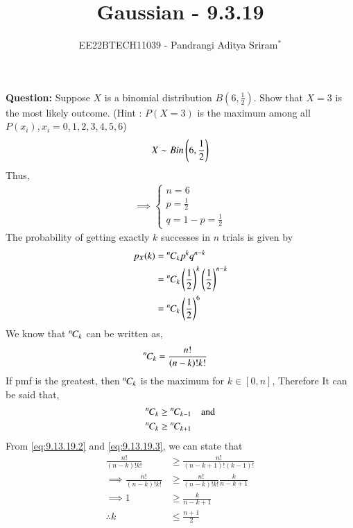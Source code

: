 \documentclass[journal,12pt,twocolumn]{IEEEtran}
\theoremstyle{remark}
\begin{document}

\vspace{3cm}

\title{Gaussian - 9.3.19}
\author{EE22BTECH11039 - Pandrangi Aditya Sriram$^{*}$%
}
\maketitle
\newpage
\bigskip

\renewcommand{\thefigure}{\theenumi}
\renewcommand{\thetable}{\theenumi}


\vspace{3cm}
\textbf{Question:} Suppose $X$ is a binomial distribution $B\left(6,\frac{1}{2}\right)$. Show that $X=3$ is the most likely outcome.
(Hint : $P(X=3)$ is the maximum among all $P(x_i),x_i=0,1,2,3,4,5,6$)\\
\solution
\begin{align}
    X \sim Bin\left(6,\frac{1}{2}\right) 
\end{align}
Thus,
\begin{align}
    \implies \begin{cases}
        n = 6\\
        p = \frac{1}{2}\\
        q = 1 - p = \frac{1}{2}
        \end{cases}\label{eq:9.13.19.1}
\end{align}
The probability of getting exactly $k$ successes in $n$ trials is given by 
\begin{align}
    p_X(k) &= {{}^{n}\mkern-1muC_{k}} p^kq^{n-k}\\
    &= {{}^{n}\mkern-1muC_{k}} \left(\frac{1}{2}\right)^k \left(\frac{1}{2}\right)^{n-k}\\
    &= {{}^{n}\mkern-1muC_{k}} \left(\frac{1}{2}\right)^6
\end{align}
We know that ${{}^{n}\mkern-1muC_{k}}$ can be written as,
\begin{align}
    {{}^{n}\mkern-1muC_{k}}&= \frac{n!}{(n-k)!k!}
    \label{eq:9.13.19.2}
\end{align}
If pmf is the greatest, then ${{}^{n}\mkern-1muC_{k}}$ is the maximum for $k \in [0,n]$, Therefore It can be said that, 
\begin{align}
	{{}^{n}\mkern-1muC_{k}} &\geq {{}^{n}\mkern-1muC_{k-1}} \label{eq:9.13.19.3}\quad \text{and} \\
	{{}^{n}\mkern-1muC_{k}} &\geq {{}^{n}\mkern-1muC_{k+1}} \label{eq:9.13.19.4}
\end{align}
From \eqref{eq:9.13.19.2} and \eqref{eq:9.13.19.3}, we can state that 
\begin{align}
	\frac{n!}{(n-k)!k!} &\geq \frac{n!}{(n-k+1)!(k-1)!}\\
	\implies \frac{n!}{(n-k)!k!} &\geq \frac{n!}{(n-k)!k!}\frac{k}{n-k+1}\\
	\implies 1 &\geq \frac{k}{n-k+1}\\
	\therefore k &\leq \frac{n+1}{2} \label{eq:9.13.19.5}
\end{align}
\end{document}
